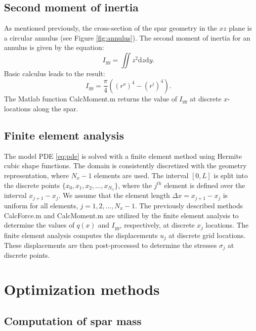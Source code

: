 \documentclass[11pt]{article}
\begin{document}
\subsection{Second moment of inertia}

As mentioned previously, the cross-section of the spar
geometry in the $xz$ plane is a circular annulus
(see Figure \ref{fig:annulus}). The second moment
of inertia for an annulus is given by the equation:
\begin{equation}
I_{yy} = \iint z^2 \text{d} z \text{d} y.
\end{equation}
Basic calculus leads to the result:
\begin{equation}
I_{yy} = \frac{\pi}{4} \left ( (r^o)^4 - (r^i)^4 \right).
\end{equation}
The Matlab function CalcMoment.m returns the value
of $I_{yy}$ at discrete $x$-locations along the spar.

\subsection{Finite element analysis}

The model PDE \eqref{eq:pde} is solved with a finite
element method using Hermite cubic shape functions.
The domain is consistently discretized with the geometry
representation, where $N_x-1$ elements are used. The interval
$[0,L]$ is split into the discrete points
$\{ x_0, x_1, x_2, \dots, x_{N_x} \}$, where the $j^{th}$
element is defined over the interval $x_{j+1} - x_j$.
We assume that the element length $\Delta x = x_{j+1} - x_j$
is uniform for all elements, $j=1,2,\dots,N_x-1$.
The previously described methods CalcForce.m and
CalcMoment.m are utilized by the finite element analysis
to determine the values of $q(x)$ and $I_{yy}$, respectively,
at discrete $x_j$ locations. The finite element analysis
computes the displacements $u_j$ at discrete grid locations.
These displacements are then post-processed to determine
the stresses $\sigma_j$ at discrete points.

\section{Optimization methods}

\subsection{Computation of spar mass}
\end{document}
